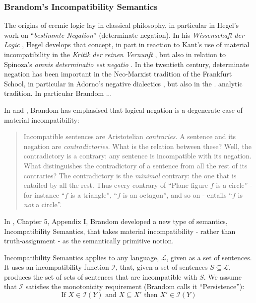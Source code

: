 \subsubsection{Brandom's Incompatibility Semantics}

The origins of eremic logic lay in classical philosophy, in particular
in Hegel's work on ``\emph{bestimmte Negation}'' (determinate
negation).  In his \emph{Wissenschaft der Logic}
\cite{HegelGWF:wisdlog}, Hegel develops that concept, in part in
reaction to Kant's use of material incompatibility in the \emph{Kritik
  der reinen Vernunft} \cite{KantI:kdrv}, but also in relation to
Spinoza's \emph{omnis determinatio est negatio} \cite{???}.  In the
twentieth century, determinate negation has been important in the
Neo-Marxist tradition of the Frankfurt School, in particular in
Adorno's negative dialectics \cite{AdornoTW:negdia}, but also in the .
analytic tradition. In particular Brandom ...


In \cite{brandom2} and \cite{brandom}, Brandom has emphasised that
logical negation is a degenerate case of material incompatibility:

\begin{quote}
Incompatible sentences are Aristotelian \emph{contraries}. A sentence
and its negation are \emph{contradictories}. What is the relation
between these? Well, the contradictory is a contrary: any sentence is
incompatible with its negation. What distinguishes the contradictory
of a sentence from all the rest of its contraries? The contradictory
is the \emph{minimal} contrary: the one that is entailed by all the
rest. Thus every contrary of ``Plane figure $f$ is a circle'' - for
instance ``$f$ is a triangle'', ``$f$ is an octagon'', and so on -
entails ``$f$ is \emph{not} a circle''.
\end{quote}

\NI In \cite{brandom}, Chapter 5, Appendix I, Brandom developed a new
type of semantics, Incompatibility Semantics, that takes material
incompatibility - rather than truth-assignment - as the semantically
primitive notion.

Incompatibility Semantics applies to any language, $\mathcal{L}$,
given as a set of sentences.  It uses an incompatibility function
$\mathcal{I}$, that, given a set of sentences $S \subseteq
\mathcal{L}$, produces the set of sets of sentences that are
incompatible with $S$.  We assume that $\mathcal{I}$ satisfies the
monotonicity requirement (Brandom calls it ``Persistence''):
\[
   \text{If } X \in \mathcal{I}(Y) \text{ and } X \subseteq X' \text{ then } X' \in \mathcal{I}(Y)
\]

